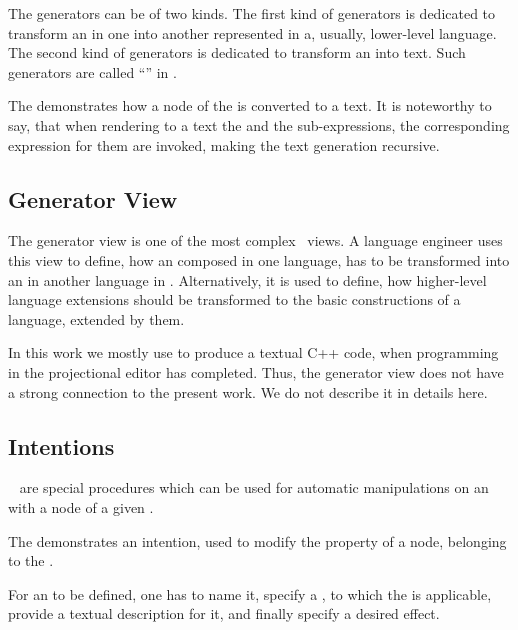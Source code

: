 The generators can be of two kinds. The first kind of generators is dedicated to transform an  in one  into
another  represented in a, usually, lower-level language. The second kind of generators is dedicated to transform an  into text.
Such generators are called ``'' in \jbmps.


The  demonstrates how a node of the   is converted to a text. It is noteworthy 
to say, that when rendering to a text the  and the  sub-expressions, the corresponding expression 
for them are invoked, making the text generation recursive.


\subsection{Generator View}
\label{generators}
The generator view is one of the most complex \jbmps\ views. A language engineer uses this view to define, how an  composed
in one language, has to be transformed into an  in another language in \jbmps. Alternatively, it is used to define, how higher-level
language extensions should be transformed to the basic constructions of a language, extended by them.

In this work we mostly use  to produce a textual C++ code, when programming in the projectional editor has completed.
Thus, the generator view does not have a strong connection to the present work. We do not describe it in details here.

\subsection{Intentions}
\label{intentions}

\jbmps\  are special procedures which can be used for automatic manipulations on an  with a node of a given .


The  demonstrates an intention, used to modify the  property of a node, belonging to 
the  . 

For an  to be defined, one has to name it, specify a , to which the  is applicable,
provide a textual description for it, and finally specify a desired effect. 

